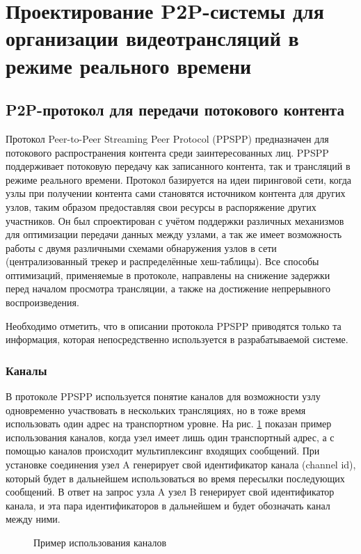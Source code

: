 \section{Проектирование P2P-системы для организации видеотрансляций в режиме реального времени}

	\subsection{P2P-протокол для передачи потокового контента}
	Протокол Peer-to-Peer Streaming Peer Protocol (PPSPP) предназначен для потокового распространения контента среди
	заинтересованных лиц. PPSPP поддерживает потоковую передачу как записанного контента, так и трансляций в режиме
	реального времени. Протокол базируется на идеи пиринговой сети, когда узлы при получении контента сами становятся
	источником контента для других узлов, таким образом предоставляя свои ресурсы в распоряжение других участников. Он
	был спроектирован с учётом поддержки различных механизмов для оптимизации передачи данных между узлами, а так же
	имеет возможность работы с двумя различными схемами обнаружения узлов в сети (централизованный трекер и
	распределённые хеш-таблицы). Все способы оптимизаций, применяемые в протоколе, направлены на снижение задержки перед
	началом просмотра трансляции, а также на достижение непрерывного воспроизведения.

	Необходимо отметить, что в описании протокола PPSPP приводятся только та информация, которая непосредственно
	используется в разрабатываемой системе.

		\subsubsection{Каналы}
		В протоколе PPSPP используется понятие каналов для возможности узлу одновременно участвовать в нескольких
		трансляциях, но в тоже время использовать один адрес на транспортном уровне. На рис. \ref{img:ppspp-chanels}
		показан пример использования каналов, когда узел имеет лишь один транспортный адрес, а с помощью каналов
		происходит мультиплексинг входящих сообщений. При установке соединения узел A генерирует свой идентификатор
		канала (channel id), который будет в дальнейшем использоваться во время пересылки последующих сообщений. В ответ
		на запрос узла A узел B генерирует свой идентификатор канала, и эта пара идентификаторов в дальнейшем и будет
		обозначать канал между ними.

		\begin{figure}[h]
			\caption{Пример использования каналов}
			\label{img:ppspp-chanels}
		\end{figure}


